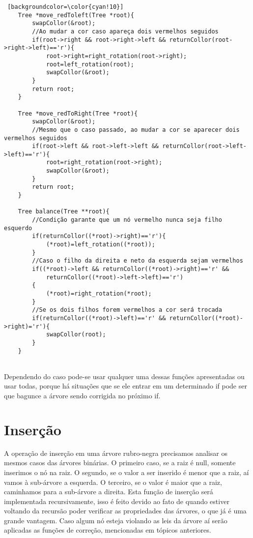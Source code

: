 \documentclass[report]{uftex}
\begin{document}
\begin{lstlisting} [backgroundcolor=\color{cyan!10}]
    Tree *move_redToleft(Tree *root){
        swapCollor(&root);
        //Ao mudar a cor caso apareça dois vermelhos seguidos
        if(root->right && root->right->left && returnCollor(root->right->left)=='r'){
            root->right=right_rotation(root->right);
            root=left_rotation(root);
            swapCollor(&root);
        }
        return root;
    }

    Tree *move_redToRight(Tree *root){
        swapCollor(&root);
        //Mesmo que o caso passado, ao mudar a cor se aparecer dois vermelhos seguidos
        if(root->left && root->left->left && returnCollor(root->left->left)=='r'){
            root=right_rotation(root->right);
            swapCollor(&root);
        }
        return root;
    }
    
    Tree balance(Tree **root){
        //Condição garante que um nó vermelho nunca seja filho esquerdo
        if(returnCollor((*root)->right)=='r'){
            (*root)=left_rotation((*root));
        }
        //Caso o filho da direita e neto da esquerda sejam vermelhos
        if((*root)->left && returnCollor((*root)->right)=='r' &&
            returnCollor((*root)->left->left)=='r')
        {
            (*root)=right_rotation(*root);
        }
        //Se os dois filhos forem vermelhos a cor será trocada
        if(returnCollor((*root)->left)=='r' && returnCollor((*root)->right)='r'){
            swapCollor(root);
        }
    }
\end{lstlisting}
    \\
    
    Dependendo do caso pode-se usar qualquer uma dessas funções apresentadas ou usar todas, porque há situações que se ele entrar em um determinado if pode ser que bagunce a árvore sendo corrigida no próximo if.
\section{Inserção}
\label{sec:insercao}

    \noindent A operação de inserção em uma árvore rubro-negra precisamos analisar os mesmos casos das árvores binárias. O primeiro caso, se a raiz é null, somente inserimos o nó na raiz. O segundo, se o valor a ser inserido é menor que a raiz, aí vamos à sub-árvore a esquerda. O terceiro, se o valor é maior que a raiz, caminhamos para a sub-árvore a direita. Esta função de inserção será implementada recursivamente, isso é feito devido ao fato de quando estiver voltando da recursão poder verificar as propriedades das árvores, o que já é uma grande vantagem. Caso algum nó esteja violando as leis da árvore aí serão aplicadas as funções de correção, mencionadas em tópicos anteriores.
    
\end{document}
